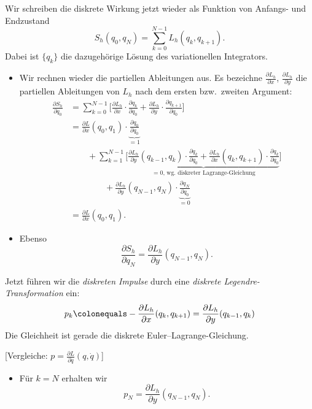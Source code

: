 Wir schreiben die diskrete Wirkung jetzt wieder als Funktion von Anfangs- und Endzustand
\begin{equation*}
S_h(q_0, q_N) = \sum_{k=0}^{N-1} L_h (q_k, q_{k+1}).
\end{equation*}
Dabei ist $\{q_k\}$ die dazugehörige Lösung des variationellen Integrators.
\begin{itemize}
\item Wir rechnen wieder die partiellen Ableitungen aus. Es bezeichne $\frac{\partial L_h}{\partial x}$,
   $\frac{\partial L_h}{\partial y}$ die partiellen Ableitungen von $L_h$ nach dem ersten bzw.\ zweiten Argument:
\begin{align*}
\frac{\partial S_h}{\partial q_0}
& = \sum_{k=0}^{N-1} \Bigg[ \frac{\partial L_h}{\partial x} \cdot\frac{\partial q_k}{\partial q_0} +  \frac{\partial L_h}{\partial y} \cdot\frac{\partial q_{k+1}}{\partial q_0}\Bigg] \\
%
& = \frac{\partial L}{\partial x} (q_0,q_1)\cdot \underbrace{\frac{\partial q_0}{\partial q_0}}_{=1} \\
& \qquad  + \sum_{k=1}^{N-1} \Bigg[ \underbrace{\frac{\partial L_h}{\partial y}(q_{k-1},q_k) \cdot\frac{\partial q_k}{\partial q_0} +  \frac{\partial L_h}{\partial x} (q_k,q_{k+1})\cdot\frac{\partial q_k}{\partial q_0}}_{\text{$=0$, wg.\ diskreter Lagrange-Gleichung}}\Bigg] \\
& \qquad \qquad  + \frac{\partial L_h}{\partial y} (q_{N-1},q_N)\cdot \underbrace{\frac{\partial q_N}{\partial q_0}}_{=0} \\
%
& =
\frac{\partial L}{\partial x} (q_0, q_1).
\end{align*}
\item Ebenso 
\begin{equation*}
\frac{\partial S_h}{\partial q_N}  = \frac{\partial L_h}{\partial y} (q_{N-1}, q_N).
\end{equation*}
\end{itemize}
Jetzt führen wir die \emph{diskreten Impulse} durch eine \emph{diskrete Legendre-Transformation} ein:
\begin{equation}
\label{eq:diskrete_lagrange_transformation}
 p_k
 \colonequals
 - \frac{\partial L_h}{\partial x} (q_k, q_{k+1})
 =
 \frac{\partial L_h}{\partial y} (q_{k-1}, q_k)
\end{equation}
Die Gleichheit ist gerade die diskrete Euler--Lagrange-Gleichung.

[Vergleiche: $p = \frac{\partial L}{\partial \dot{q}}(q,\dot{q})$]

\begin{itemize}
\item Für $k=N$ erhalten wir
\begin{equation*}
p_N = \frac{\partial L_h}{\partial y} (q_{N-1}, q_N).
\end{equation*}
\end{itemize}

